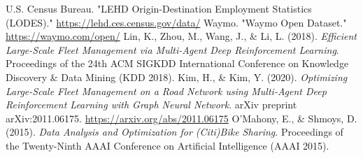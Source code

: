\documentclass[12pt]{article}
\begin{document}
\begin{thebibliography}{9}
		 U.S. Census Bureau. "LEHD Origin-Destination Employment Statistics
		(LODES)." \url{https://lehd.ces.census.gov/data/}
		 Waymo. "Waymo Open Dataset." \url{https://waymo.com/open/}
		 Lin, K., Zhou, M., Wang, J., \& Li, L. (2018). \textit{Efficient
		Large-Scale Fleet Management via Multi-Agent Deep Reinforcement Learning}. Proceedings
		of the 24th ACM SIGKDD International Conference on Knowledge Discovery \& Data Mining (KDD 2018).
		 Kim, H., \& Kim, Y. (2020). \textit{Optimizing Large-Scale Fleet
				Management on a Road Network using Multi-Agent Deep Reinforcement Learning with Graph
		Neural Network}. arXiv preprint arXiv:2011.06175. \url{https://arxiv.org/abs/2011.06175}
		 O’Mahony, E., \& Shmoys, D. (2015). \textit{Data Analysis and
		Optimization for (Citi)Bike Sharing}. Proceedings of the Twenty-Ninth AAAI Conference
		on Artificial Intelligence (AAAI 2015).
\end{thebibliography}
\end{document}
